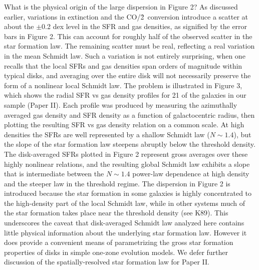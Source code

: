 What is the physical origin of the large dispersion in Figure 2?  As 
discussed earlier, variations in extinction and the CO/\h2\ conversion
introduce a scatter at about the $\pm$0.2 dex level in the
SFR and gas densities, as signified by the error
bars in Figure 2.  This can account for roughly half of the observed
scatter in the star formation law.  The remaining scatter
must be real, reflecting a real variation in the mean Schmidt law.
Such a variation is not entirely surprising, when one recalls that the 
local SFRs and gas densities span orders of magnitude within
typical disks, and averaging over the entire disk will not necessarily
preserve the form of a nonlinear local Schmidt law.
The problem is illustrated in Figure 3, which shows the radial SFR vs 
gas density profiles for 21 of the galaxies in our sample (Paper II).
Each profile was produced by measuring the 
azimuthally averaged gas density and SFR density as a function
of galactocentric radius, then plotting the resulting SFR vs gas
density relation on a common scale.
At high densities the SFRs are well represented by a shallow
Schmidt law ($N \sim 1.4$), but the slope of the star formation law
steepens abruptly below the threshold density.  The disk-averaged 
SFRs plotted in Figure 2 represent gross averages over these highly nonlinear
relations, and the resulting global Schmidt law exhibits a slope that is 
intermediate between the $N \sim 1.4$ power-law dependence at
high density and the steeper law in the threshold regime.  The dispersion
in Figure 2 is introduced because the star formation in some galaxies
is highly concentrated to the high-density part of the local Schmidt law,
while in other systems much of the star formation takes place near
the threshold density (see K89).  This 
underscores the caveat that disk-averaged Schmidt law analyzed here 
contains little physical information about the underlying star formation
law.  However it does provide a convenient means of parametrizing the
gross star formation properties of disks in simple one-zone evolution models.
We defer further discussion of the spatially-resolved star formation law
for Paper II.

